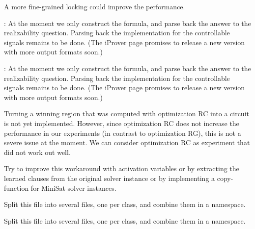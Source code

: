 
\begin{DoxyRefList}
\item[\label{todo__todo000007}%
\hypertarget{todo__todo000007}{}%
Member \hyperlink{classClauseExplorerSAT_a674651f8fbf9ed93264ce3369bd5332b}{Clause\-Explorer\-S\-A\-T\-:\-:new\-\_\-info\-\_\-lock\-\_\-} ]A more fine-\/grained locking could improve the performance.  
\item[\label{todo__todo000001}%
\hypertarget{todo__todo000001}{}%
Class \hyperlink{classEPRSynthesizer}{E\-P\-R\-Synthesizer} ]\-: At the moment we only construct the formula, and parse back the answer to the realizability question. Parsing back the implementation for the controllable signals remains to be done. (The i\-Prover page promises to release a new version with more output formats soon.)  
\item[\label{todo__todo000002}%
\hypertarget{todo__todo000002}{}%
Member \hyperlink{classEPRSynthesizer_ab5eb613a7e5e4f8d408938531f745e4e}{E\-P\-R\-Synthesizer\-:\-:run} ()]\-: At the moment we only construct the formula, and parse back the answer to the realizability question. Parsing back the implementation for the controllable signals remains to be done. (The i\-Prover page promises to release a new version with more output formats soon.)  
\item[\label{todo__todo000003}%
\hypertarget{todo__todo000003}{}%
Class \hyperlink{classLearnSynthQBFInd}{Learn\-Synth\-Q\-B\-F\-Ind} ]Turning a winning region that was computed with optimization R\-C into a circuit is not yet implemented. However, since optimization R\-C does not increase the performance in our experiments (in contrast to optimization R\-G), this is not a severe issue at the moment. We can consider optimization R\-C as experiment that did not work out well.  
\item[\label{todo__todo000004}%
\hypertarget{todo__todo000004}{}%
Member \hyperlink{classMiniSatApi_a27013ace25320f68252bef5ba9f2e9ad}{Mini\-Sat\-Api\-:\-:inc\-Push} ()]Try to improve this workaround with activation variables or by extracting the learned clauses from the original solver instance or by implementing a copy-\/function for Mini\-Sat solver instances.  
\item[\label{todo__todo000005}%
\hypertarget{todo__todo000005}{}%
File \hyperlink{ParallelLearner_8cpp}{Parallel\-Learner.cpp} ]Split this file into several files, one per class, and combine them in a namespace.  
\item[\label{todo__todo000006}%
\hypertarget{todo__todo000006}{}%
File \hyperlink{ParallelLearner_8h}{Parallel\-Learner.h} ]Split this file into several files, one per class, and combine them in a namespace. 
\end{DoxyRefList}